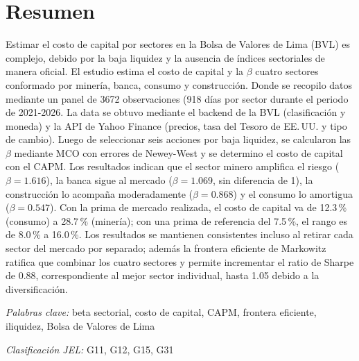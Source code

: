 \documentclass[12pt]{article}
\begin{document}
\section{Resumen}
\noindent Estimar el costo de capital por sectores en la Bolsa de Valores de Lima (BVL) es complejo, debido por la baja liquidez y la ausencia de índices sectoriales de manera oficial. El estudio estima el costo de capital y la  $\beta$ cuatro sectores conformado por minería, banca, consumo y construcción. Donde se recopilo datos mediante un panel de 3672 observaciones (918 días por sector durante el periodo de 2021-2026. La data se obtuvo mediante el backend de la BVL (clasificación y moneda) y la API de Yahoo Finance (precios, tasa del Tesoro de EE.\,UU. y tipo de cambio). Luego de seleccionar seis acciones por baja liquidez, se calcularon las $\beta$ mediante MCO con errores de Newey-West y se determino el costo de capital con el CAPM. Los resultados indican que  el sector minero amplifica el riesgo ($\beta=1.616$), la banca sigue al mercado ($\beta=1.069$, sin diferencia de 1), la construcción lo acompaña moderadamente ($\beta=0.868$) y el consumo lo amortigua ($\beta=0.547$). Con la prima de mercado realizada, el costo de capital va de 12.3\,\% (consumo) a 28.7\,\% (minería); con una prima de referencia del 7.5\,\%, el rango es de 8.0\,\% a 16.0\,\%. Los resultados se mantienen consistentes incluso al retirar cada sector del mercado por separado; además la frontera eficiente de Markowitz ratifica que combinar los cuatro sectores y permite incrementar el ratio de Sharpe de 0.88, correspondiente al mejor sector individual, hasta 1.05 debido a la diversificación.

\vspace{6pt}
\noindent\textit{Palabras clave:} beta sectorial, costo de capital, CAPM, frontera eficiente, iliquidez, Bolsa de Valores de Lima

\noindent\textit{Clasificación JEL:} G11, G12, G15, G31

\newpage
\end{document}
